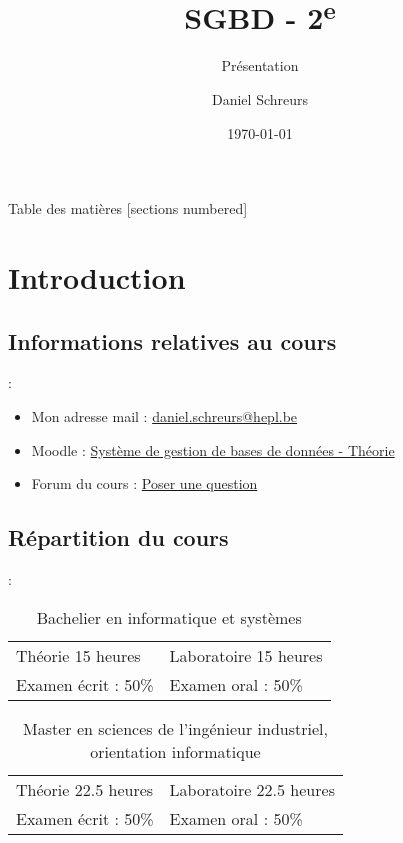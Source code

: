 \documentclass[10pt]{beamer}
\title{SGBD - 2\textsuperscript{e}}
\subtitle{Présentation}
\date{\today}
\author{Daniel Schreurs}
\institute{Haute École de la Province de Liège}
\begin{document}
\maketitle

\begin{frame}[allowframebreaks]{Table des matières}
    [sections numbered]
    \tableofcontents
\end{frame}

\section{Introduction}

\subsection{Informations relatives au cours}
\begin{frame}{\secname : \subsecname}
    \begin{itemize}
        \item Mon adresse mail : \href{mailto:daniel.schreurs@hepl.be}{daniel.schreurs@hepl.be}
        \item Moodle : \href{https://moodle.ecolevirtuelle.be/course/view.php?id=20914}{Système de gestion de bases de données - Théorie}
        \item Forum du cours : \href{https://moodle.ecolevirtuelle.be/mod/forum/view.php?id=116963}{Poser une question}
    \end{itemize}
\end{frame}

\subsection{Répartition du cours}
\begin{frame}{\secname : \subsecname}
    \begin{table}[]
        \begin{tabular}{ll}
            Théorie 15 heures   & Laboratoire 15 heures \\
            Examen écrit : 50\% & Examen oral : 50\%
        \end{tabular}
        \caption*{Bachelier en informatique et systèmes}
    \end{table}
    \begin{table}[]
        \begin{tabular}{ll}
            Théorie 22.5 heures & Laboratoire 22.5 heures \\
            Examen écrit : 50\% & Examen oral : 50\%
        \end{tabular}
        \caption*{Master en sciences de l'ingénieur industriel, orientation informatique}
    \end{table}
\end{frame}
\end{document}
